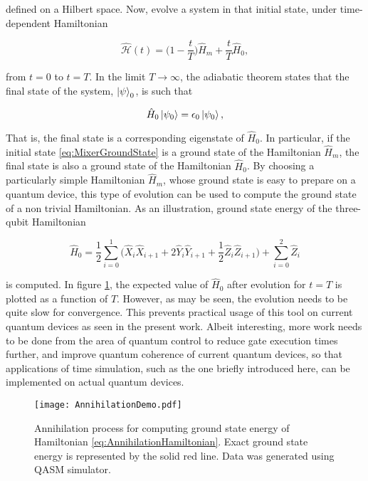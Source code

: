 \noindent defined on a Hilbert space. Now, evolve a system in that initial state, under time-dependent Hamiltonian

\begin{equation}
    \hat{\mathcal{H}}(t) = \bigg(1-\frac{t}{T}\bigg)\hat{H}_m + \frac{t}{T}\hat{H}_0,
    \label{eq:AdiabaticHamiltonian}
\end{equation}

\noindent from $t=0$ to $t=T$. In the limit $T \rightarrow \infty$, the adiabatic theorem states that the final state of the system, $\ket{\psi}_0$, is such that 

\begin{equation}
    \hat{H}_0 \ket{\psi_0} = \epsilon_0 \ket{\psi_0},
    \label{eq:MixerGroundState}
\end{equation}

That is, the final state is a corresponding eigenstate of $\hat{H}_0$. In particular, if the initial state \ref{eq:MixerGroundState} is a ground state of the Hamiltonian $\hat{H}_m$, the final state is also a ground state of the Hamiltonian $\hat{H}_0$. By choosing a particularly simple Hamiltonian $\hat{H}_m$, whose ground state is easy to prepare on a quantum device, this type of evolution can be used to compute the ground state of a non trivial Hamiltonian. As an illustration, ground state energy of the three-qubit Hamiltonian

\begin{equation}
    \hat{H}_0 = \frac{1}{2}\sum_{i=0}^{1} \bigg(\hat{X}_i\hat{X}_{i+1} + 2\hat{Y}_i\hat{Y}_{i+1} + \frac{1}{2}\hat{Z}_i\hat{Z}_{i+1}\bigg) + \sum_{i=0}^{2} \hat{Z}_i
    \label{eq:AnnihilationHamiltonian}
\end{equation}

\noindent is computed. In figure \ref{fig:AnnihilationProcess}, the expected value of $\hat{H}_0$ after evolution for $t=T$ is plotted as a function of $T$. However, as may be seen, the evolution needs to be quite slow for convergence. This prevents practical usage of this tool on current quantum devices as seen in the present work. Albeit interesting, more work needs to be done from the area of quantum control to reduce gate execution times further, and improve quantum coherence of current quantum devices, so that applications of time simulation, such as the one briefly introduced here, can be implemented on actual quantum devices.

\begin{figure}
    \centering
    \texttt{[image: AnnihilationDemo.pdf]}
    \caption{Annihilation process for computing ground state energy of Hamiltonian \ref{eq:AnnihilationHamiltonian}. Exact ground state energy is represented by the solid red line. Data was generated using QASM simulator.}
    \label{fig:AnnihilationProcess}
\end{figure}
